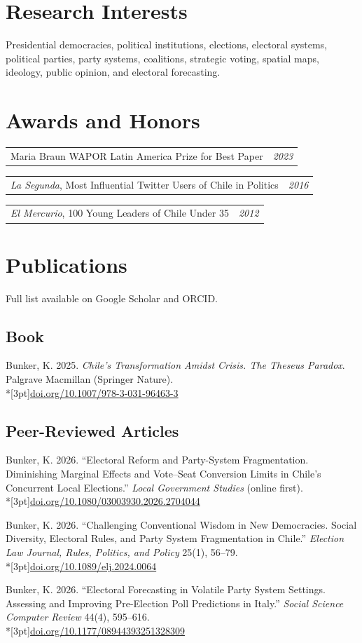 \documentclass[11pt,letterpaper]{article}
\makeatletter
\newif\ifafterhead
\newlength{\entrygap}\setlength{\entrygap}{8.5pt}
\newcommand{\gap}{\ifafterhead\global\afterheadfalse\else\vspace{\entrygap}\fi}
\newcommand{\entry}[1]{\par\gap\hangindent=13pt\hangafter=1\noindent #1\par}
\newcommand{\doi}[1]{\\*[3pt]{\small\href{https://doi.org/#1}{doi.org/#1}}}
\newcommand{\dated}[2]{\par\gap\noindent\begin{tabularx}{\linewidth}{@{}X@{\hspace{6pt}}r@{}}#1 & \textit{#2}\end{tabularx}\par}
\makeatother
\begin{document}
\section{Research Interests}
Presidential democracies, political institutions, elections, electoral systems, political parties, party systems, coalitions, strategic voting, spatial maps, ideology, public opinion, and electoral forecasting.

\section{Awards and Honors}
\dated{Maria Braun WAPOR Latin America Prize for Best Paper}{2023}
\dated{\textit{La Segunda}, Most Influential Twitter Users of Chile in Politics}{2016}
\dated{\textit{El Mercurio}, 100 Young Leaders of Chile Under 35}{2012}

\newpage
\section{Publications}
Full list available on Google Scholar and ORCID.

\subsection{Book}
\entry{Bunker, K. 2025. \textit{Chile's Transformation Amidst Crisis. The Theseus Paradox}. Palgrave Macmillan (Springer Nature).\doi{10.1007/978-3-031-96463-3}}

\subsection{Peer-Reviewed Articles}
\entry{Bunker, K. 2026. ``Electoral Reform and Party-System Fragmentation. Diminishing Marginal Effects and Vote--Seat Conversion Limits in Chile's Concurrent Local Elections.'' \textit{Local Government Studies} (online first).\doi{10.1080/03003930.2026.2704044}}

\entry{Bunker, K. 2026. ``Challenging Conventional Wisdom in New Democracies. Social Diversity, Electoral Rules, and Party System Fragmentation in Chile.'' \textit{Election Law Journal, Rules, Politics, and Policy} 25(1), 56--79.\doi{10.1089/elj.2024.0064}}

\entry{Bunker, K. 2026. ``Electoral Forecasting in Volatile Party System Settings. Assessing and Improving Pre-Election Poll Predictions in Italy.'' \textit{Social Science Computer Review} 44(4), 595--616.\doi{10.1177/08944393251328309}}
\end{document}
